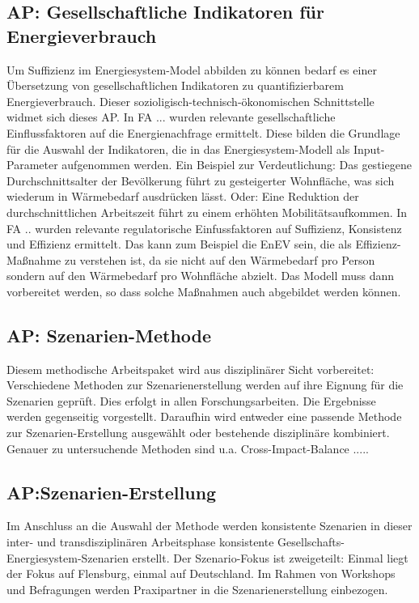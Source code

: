 \documentclass[a4paper,11pt,twoside]{scrartcl}
\begin{document}
\subsection*{AP: Gesellschaftliche Indikatoren für Energieverbrauch}
Um Suffizienz im Energiesystem-Model abbilden zu können bedarf es einer Übersetzung von gesellschaftlichen Indikatoren zu quantifizierbarem Energieverbrauch. Dieser sozioligisch-technisch-ökonomischen Schnittstelle widmet sich dieses AP. In FA ... wurden relevante gesellschaftliche Einflussfaktoren auf die Energienachfrage ermittelt. Diese bilden die Grundlage für die Auswahl der Indikatoren, die in das Energiesystem-Modell als Input-Parameter aufgenommen werden. Ein Beispiel zur Verdeutlichung: Das gestiegene Durchschnittsalter der Bevölkerung führt zu gesteigerter Wohnfläche, was sich wiederum in Wärmebedarf ausdrücken lässt. Oder: Eine Reduktion der durchschnittlichen Arbeitszeit führt zu einem erhöhten Mobilitätsaufkommen. In FA .. wurden relevante regulatorische Einfussfaktoren auf Suffizienz, Konsistenz und Effizienz ermittelt. Das kann zum Beispiel die EnEV sein, die als Effizienz-Maßnahme zu verstehen ist, da sie nicht auf den Wärmebedarf pro Person sondern auf den Wärmebedarf pro Wohnfläche abzielt. Das Modell muss dann vorbereitet werden, so dass solche Maßnahmen auch abgebildet werden können.

\subsection*{AP: Szenarien-Methode}
Diesem methodische Arbeitspaket wird aus disziplinärer Sicht vorbereitet: Verschiedene Methoden zur Szenarienerstellung werden auf ihre Eignung für die Szenarien geprüft. Dies erfolgt in allen Forschungsarbeiten. Die Ergebnisse werden gegenseitig vorgestellt. Daraufhin wird entweder eine passende Methode zur Szenarien-Erstellung ausgewählt oder bestehende disziplinäre kombiniert. Genauer zu untersuchende Methoden sind u.a. Cross-Impact-Balance .....

\subsection*{AP:Szenarien-Erstellung}
Im Anschluss an die Auswahl der Methode werden konsistente Szenarien in dieser inter- und transdisziplinären Arbeitsphase konsistente Gesellschafts-Energiesystem-Szenarien erstellt. Der Szenario-Fokus ist zweigeteilt: Einmal liegt der Fokus auf Flensburg, einmal auf Deutschland. Im Rahmen von Workshops und Befragungen werden Praxipartner in die Szenarienerstellung einbezogen. 
\end{document}
